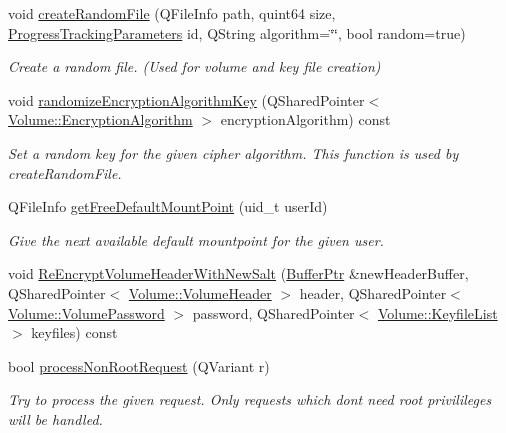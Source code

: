 \begin{DoxyCompactItemize}
void \hyperlink{class_gost_crypt_1_1_core_1_1_core_base_a4dab0d8693abc9f3356b91b0c7943ad2}{create\+Random\+File} (Q\+File\+Info path, quint64 size, \hyperlink{struct_gost_crypt_1_1_core_1_1_progress_tracking_parameters}{Progress\+Tracking\+Parameters} id, Q\+String algorithm=\char`\"{}\char`\"{}, bool random=true)
\begin{DoxyCompactList}\small\item\em Create a random file. (Used for volume and key file creation) \end{DoxyCompactList}\item 
void \hyperlink{class_gost_crypt_1_1_core_1_1_core_base_a45d7cd1c227100a405f3c655e53aab64}{randomize\+Encryption\+Algorithm\+Key} (Q\+Shared\+Pointer$<$ \hyperlink{class_gost_crypt_1_1_volume_1_1_encryption_algorithm}{Volume\+::\+Encryption\+Algorithm} $>$ encryption\+Algorithm) const
\begin{DoxyCompactList}\small\item\em Set a random key for the given cipher algorithm. This function is used by create\+Random\+File. \end{DoxyCompactList}\item 
Q\+File\+Info \hyperlink{class_gost_crypt_1_1_core_1_1_core_base_ad45372f3d1ee5084aa25cec4b1753f28}{get\+Free\+Default\+Mount\+Point} (uid\+\_\+t user\+Id)
\begin{DoxyCompactList}\small\item\em Give the next available default mountpoint for the given user. \end{DoxyCompactList}\item 
void \hyperlink{class_gost_crypt_1_1_core_1_1_core_base_a1bbcd36f2a0eeeaf997cce7cd54cf008}{Re\+Encrypt\+Volume\+Header\+With\+New\+Salt} (\hyperlink{class_gost_crypt_1_1_buffer_ptr}{Buffer\+Ptr} \&new\+Header\+Buffer, Q\+Shared\+Pointer$<$ \hyperlink{class_gost_crypt_1_1_volume_1_1_volume_header}{Volume\+::\+Volume\+Header} $>$ header, Q\+Shared\+Pointer$<$ \hyperlink{class_gost_crypt_1_1_volume_1_1_volume_password}{Volume\+::\+Volume\+Password} $>$ password, Q\+Shared\+Pointer$<$ \hyperlink{namespace_gost_crypt_1_1_volume_af2dce083ae31a8d22257d609e924963d}{Volume\+::\+Keyfile\+List} $>$ keyfiles) const
\item 
bool \hyperlink{class_gost_crypt_1_1_core_1_1_core_base_af99f04d68b53946322c568b1ad0a88e6}{process\+Non\+Root\+Request} (Q\+Variant r)
\begin{DoxyCompactList}\small\item\em Try to process the given request. Only requests which don\textquotesingle{}t need root privilileges will be handled. \end{DoxyCompactList}\item 

\end{DoxyCompactItemize}
